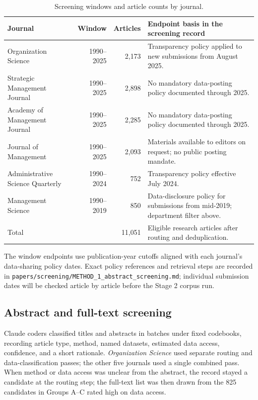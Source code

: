 \documentclass[11pt]{article}
\newcommand{\artifact}[1]{\nolinkurl{#1}}
\begin{document}
\begin{table}[H]\centering\small
\begin{tabularx}{\linewidth}{@{}lrrY@{}}\toprule
Journal & Window & Articles & Endpoint basis in the screening record\\\midrule
Organization Science & 1990--2025 & 2,173 & Transparency policy applied to new submissions from August 2025.\\
Strategic Management Journal & 1990--2025 & 2,898 & No mandatory data-posting policy documented through 2025.\\
Academy of Management Journal & 1990--2025 & 2,285 & No mandatory data-posting policy documented through 2025.\\
Journal of Management & 1990--2025 & 2,093 & Materials available to editors on request; no public posting mandate.\\
Administrative Science Quarterly & 1990--2024 & 752 & Transparency policy effective July 2024.\\
Management Science & 1990--2019 & 850 & Data-disclosure policy for submissions from mid-2019; department filter above.\\\midrule
Total && 11,051 & Eligible research articles after routing and deduplication.\\\bottomrule
\end{tabularx}\caption{Screening windows and article counts by journal.}\end{table}
The window endpoints use publication-year cutoffs aligned with each journal's data-sharing policy dates. Exact policy references and retrieval steps are recorded in \artifact{papers/screening/METHOD_1_abstract_screening.md}; individual submission dates will be checked article by article before the Stage 2 corpus run.

\subsection{Abstract and full-text screening}
Claude coders classified titles and abstracts in batches under fixed codebooks, recording article type, method, named datasets, estimated data access, confidence, and a short rationale. \textit{Organization Science} used separate routing and data-classification passes; the other five journals used a single combined pass. When method or data access was unclear from the abstract, the record stayed a candidate at the routing step; the full-text list was then drawn from the 825 candidates in Groups A--C rated high on data access.
\end{document}
